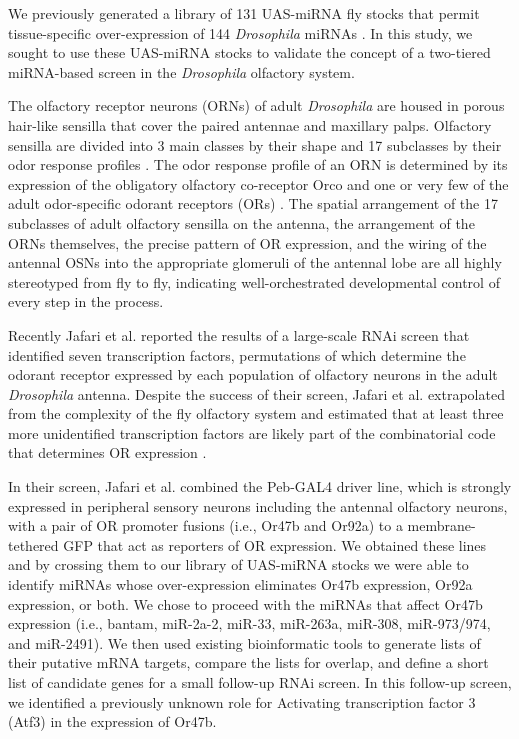 We previously generated a library of 131 UAS-miRNA fly stocks that permit tissue-specific over-expression of 144 \emph{Drosophila} miRNAs \cite{suh_2015aa}.
In this study, we sought to use these UAS-miRNA stocks to validate the concept of a two-tiered miRNA-based screen in the \emph{Drosophila} olfactory system.

The olfactory receptor neurons (ORNs) of adult \emph{Drosophila} are housed in porous hair-like sensilla that cover the paired antennae and maxillary palps.
Olfactory sensilla are divided into 3 main classes by their shape and 17 subclasses by their odor response profiles \cite{Couto_Alenius_Dickson_2005}.
The odor response profile of an ORN is determined by its expression of the obligatory olfactory co-receptor Orco and one or very few of the adult odor-specific odorant receptors (ORs) \cite{Vosshall_Stocker_2007}.
The spatial arrangement of the 17 subclasses of adult olfactory sensilla on the antenna, the arrangement of the ORNs themselves, the precise pattern of OR expression, and the wiring of the antennal OSNs into the appropriate glomeruli of the antennal lobe are all highly stereotyped from fly to fly, indicating well-orchestrated developmental control of every step in the process.

Recently Jafari et al. reported the results of a large-scale RNAi screen that identified seven transcription factors, permutations of which determine the odorant receptor expressed by each population of olfactory neurons in the adult \emph{Drosophila} antenna.
Despite the success of their screen, Jafari et al. extrapolated from the complexity of the fly olfactory system and estimated that at least three more unidentified transcription factors are likely part of the combinatorial code that determines OR expression \cite{Brochtrup_Hummel_Alenius_2012}.

In their screen, Jafari et al. combined the Peb-GAL4 driver line, which is strongly expressed in peripheral sensory neurons including the antennal olfactory neurons, with a pair of OR promoter fusions (i.e., Or47b and Or92a) to a membrane-tethered GFP that act as reporters of OR expression.
We obtained these lines and by crossing them to our library of UAS-miRNA stocks we were able to identify miRNAs whose over-expression eliminates Or47b expression, Or92a expression, or both.
We chose to proceed with the miRNAs that affect Or47b expression (i.e., bantam, miR-2a-2, miR-33, miR-263a, miR-308, miR-973/974, and miR-2491).
We then used existing bioinformatic tools to generate lists of their putative mRNA targets, compare the lists for overlap, and define a short list of candidate genes for a small follow-up RNAi screen.
In this follow-up screen, we identified a previously unknown role for Activating transcription factor 3 (Atf3) in the expression of Or47b.
